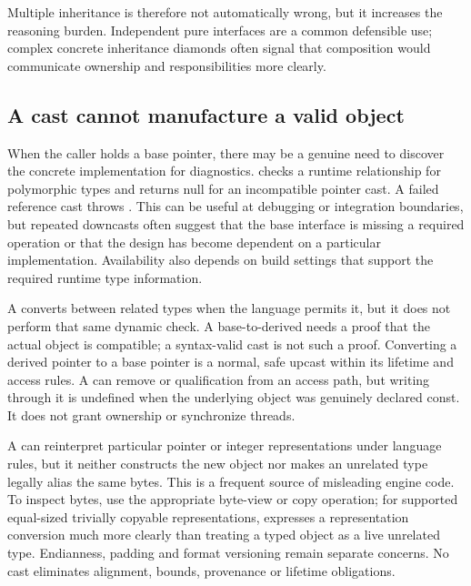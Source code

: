 Multiple inheritance is therefore not automatically wrong, but it increases the reasoning burden. Independent pure interfaces are a common defensible use; complex concrete inheritance diamonds often signal that composition would communicate ownership and responsibilities more clearly.

\subsection{A cast cannot manufacture a valid object}\label{01-foundations-i-ch004-a-cast-cannot-manufacture-a-valid-object}

\hypertarget{01-foundations-i-ch004-a-cast-cannot-manufacture-a-valid-object}{}

When the caller holds a base pointer, there may be a genuine need to discover the concrete implementation for diagnostics.  checks a runtime relationship for polymorphic types and returns null for an incompatible pointer cast. A failed reference cast throws . This can be useful at debugging or integration boundaries, but repeated downcasts often suggest that the base interface is missing a required operation or that the design has become dependent on a particular implementation. Availability also depends on build settings that support the required runtime type information.

A  converts between related types when the language permits it, but it does not perform that same dynamic check. A base-to-derived  needs a proof that the actual object is compatible; a syntax-valid cast is not such a proof. Converting a derived pointer to a base pointer is a normal, safe upcast within its lifetime and access rules. A  can remove  or  qualification from an access path, but writing through it is undefined when the underlying object was genuinely declared const. It does not grant ownership or synchronize threads.

A  can reinterpret particular pointer or integer representations under language rules, but it neither constructs the new object nor makes an unrelated type legally alias the same bytes. This is a frequent source of misleading engine code. To inspect bytes, use the appropriate byte-view or copy operation; for supported equal-sized trivially copyable representations,  expresses a representation conversion much more clearly than treating a typed object as a live unrelated type. Endianness, padding and format versioning remain separate concerns. No cast eliminates alignment, bounds, provenance or lifetime obligations.

